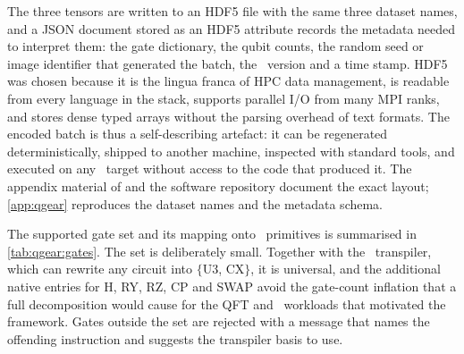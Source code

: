 The three tensors are written to an HDF5 file with the same three dataset names, and a JSON document stored as an HDF5 attribute records the metadata needed to interpret them: the gate dictionary, the qubit counts, the random seed or image identifier that generated the batch, the \qiskit\ version and a time stamp. HDF5 was chosen because it is the lingua franca of HPC data management, is readable from every language in the stack, supports parallel I/O from many MPI ranks, and stores dense typed arrays without the parsing overhead of text formats. The encoded batch is thus a self-describing artefact: it can be regenerated deterministically, shipped to another machine, inspected with standard tools, and executed on any \cudaq\ target without access to the code that produced it. The appendix material of \cite{guo2025qgear} and the software repository \cite{guo2025qgearsoftware} document the exact layout; \cref{app:qgear} reproduces the dataset names and the metadata schema.

The supported gate set and its mapping onto \cudaq\ primitives is summarised in \cref{tab:qgear:gates}. The set is deliberately small. Together with the \qiskit\ transpiler, which can rewrite any circuit into $\{$U3, CX$\}$, it is universal, and the additional native entries for H, RY, RZ, CP and SWAP avoid the gate-count inflation that a full decomposition would cause for the QFT and \qcrank\ workloads that motivated the framework. Gates outside the set are rejected with a message that names the offending instruction and suggests the transpiler basis to use.

